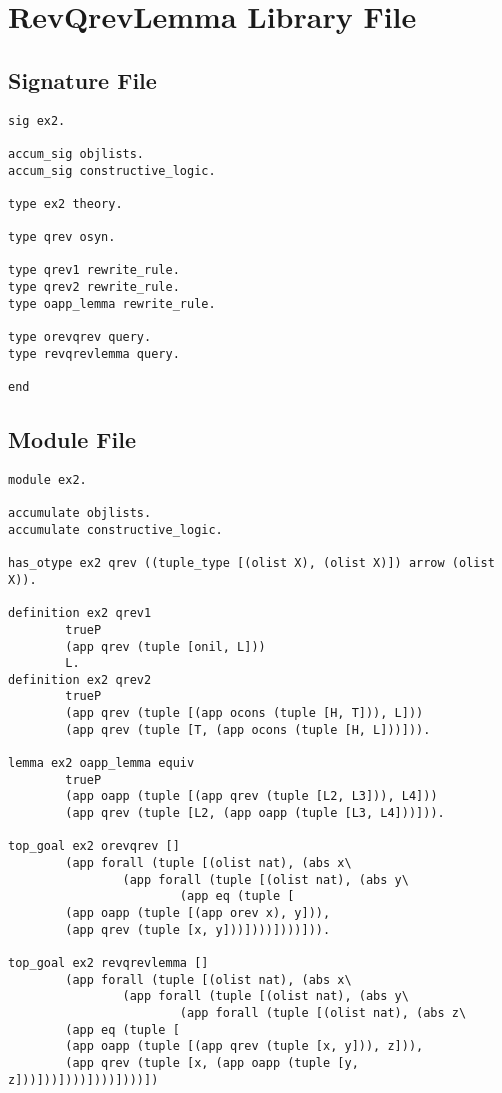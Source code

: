 \section{RevQrevLemma Library File}
\label{revqrevlemma}
\subsection{Signature File}
\begin{verbatim}
sig ex2.

accum_sig objlists.
accum_sig constructive_logic.

type ex2 theory.

type qrev osyn.

type qrev1 rewrite_rule.
type qrev2 rewrite_rule.
type oapp_lemma rewrite_rule.

type orevqrev query.
type revqrevlemma query.

end
\end{verbatim}

\subsection{Module File}
\begin{verbatim}
module ex2.

accumulate objlists.
accumulate constructive_logic.

has_otype ex2 qrev ((tuple_type [(olist X), (olist X)]) arrow (olist X)).

definition ex2 qrev1 
        trueP
        (app qrev (tuple [onil, L]))
        L.
definition ex2 qrev2
        trueP
        (app qrev (tuple [(app ocons (tuple [H, T])), L]))
        (app qrev (tuple [T, (app ocons (tuple [H, L]))])).

lemma ex2 oapp_lemma equiv
        trueP
        (app oapp (tuple [(app qrev (tuple [L2, L3])), L4]))
        (app qrev (tuple [L2, (app oapp (tuple [L3, L4]))])).

top_goal ex2 orevqrev []
        (app forall (tuple [(olist nat), (abs x\
                (app forall (tuple [(olist nat), (abs y\
                        (app eq (tuple [
        (app oapp (tuple [(app orev x), y])),
        (app qrev (tuple [x, y]))])))])))])).

top_goal ex2 revqrevlemma []
        (app forall (tuple [(olist nat), (abs x\
                (app forall (tuple [(olist nat), (abs y\
                        (app forall (tuple [(olist nat), (abs z\
        (app eq (tuple [
        (app oapp (tuple [(app qrev (tuple [x, y])), z])),
        (app qrev (tuple [x, (app oapp (tuple [y, z]))]))])))])))])))])
\end{verbatim}



